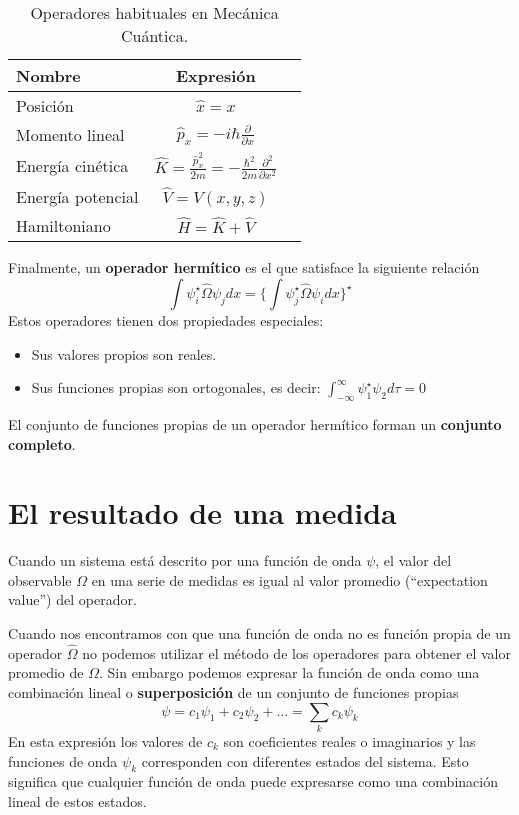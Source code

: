 \begin{table}[h]
  \begin{center}
    \small
    \begin{tabular}{lcr}
      \toprule
      Nombre & Expresión \\
      \midrule
      Posición & $\hat{x}=x$ \\
      Momento lineal & $\hat{p}_x=-i\hbar \frac{\partial}{\partial x}$ \\
      Energía cinética & $\hat{K}=\frac{\hat{p}_x^2}{2m}=
      -\frac{\hbar^2}{2m}\frac{\partial^2}{\partial x^2}$\\
      Energía potencial & $\hat{V}=V(x,y,z)$ \\
      Hamiltoniano & $\hat{H}=\hat{K}+\hat{V}$ \\
      \bottomrule
    \end{tabular}
  \end{center}
  \caption{Operadores habituales en Mecánica Cuántica.}
  \label{tab:operators}
\end{table}

Finalmente, un \textbf{operador hermítico} es el que
satisface la siguiente relación
\begin{equation}
    \int\psi_i^\star\hat{\Omega}\psi_jdx=
    \bigg\{\int\psi_j^\star\hat{\Omega}\psi_idx\bigg\}^\star
\end{equation}
Estos operadores tienen dos propiedades especiales:
\begin{itemize}
    \item Sus valores propios son reales.
    \item Sus funciones propias son ortogonales, es decir:
    $\int_{-\infty}^\infty\psi_1^\star\psi_2d\tau=0$
\end{itemize}
El conjunto de funciones propias de un operador 
    hermítico forman un \textbf{conjunto completo}.

\section{El resultado de una medida}
\begin{theorem}
Cuando un sistema está descrito por una función de onda
$\psi$, el valor del observable $\Omega$ en una serie 
de medidas es igual al valor promedio (“expectation 
value”) del operador.
\end{theorem}
Cuando nos encontramos con que una función de onda no es
función propia de un operador $\hat{\Omega}$ no podemos
utilizar el método de los operadores para obtener el valor
promedio de $\Omega$. Sin embargo podemos expresar la
función de onda como una combinación lineal o
\textbf{superposición} de un conjunto de funciones
propias
\begin{equation}
\psi =  c_1\psi_1 + c_2\psi_2 + ... = \sum_kc_k\psi_k    
\end{equation}
En esta expresión los valores de $c_k$ son coeficientes
reales o imaginarios y las funciones de onda $\psi_k$
corresponden con diferentes estados del sistema. Esto
significa que cualquier función de onda puede 
expresarse como una combinación lineal de estos estados.

